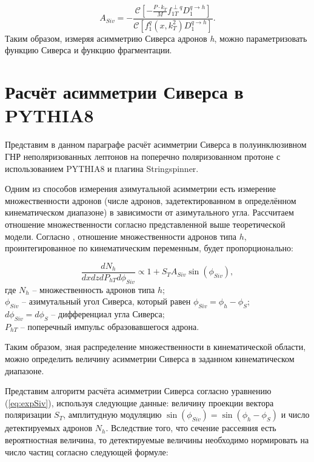 \documentclass{extreport}
\begin{document}
\begin{equation}
	A_{Siv} = - \frac{\mathcal{C}\left [-\frac{P\cdot k_T}{M}f_{1T}^{\perp q}D_1^{q \rightarrow h} \right]}{\mathcal{C} \left[f_1^q (x,k^2_T ) D_1^{q \rightarrow h} \right]}.
\end{equation}
Таким образом, измеряя асимметрию Сиверса адронов \textit{h}, можно параметризовать функцию Сиверса и функцию фрагментации. 




\section{Расчёт асимметрии Сиверса в PYTHIA8}

Представим в данном параграфе расчёт асимметрии Сиверса в полуинклюзивном ГНР неполяризованных лептонов на поперечно поляризованном протоне с использованием PYTHIA8 и плагина Stringspinner.  

Одним из способов измерения азимутальной асимметрии есть измерение множественности адронов (числе адронов, задетектированном в определённом кинематическом диапазоне) в зависимости от азимутального угла. Рассчитаем отношение множественности согласно представленной выше теоретической модели. Согласно \cite{Anselmino_2011}, отношение множественности адронов типа $h$, проинтегированное по кинематическим переменным, будет пропорционально:

\begin{equation}
	\label{eq:expSiv}
	\frac{dN_h}{dxdzdP_{hT}d\phi_{Siv}} \propto 1 + S_T A_{Siv} \sin (\phi_{Siv}),
\end{equation}
где $N_h$ -- множественность адронов типа $h$; \\
$\phi_{Siv}$ -- азимутальный угол Сиверса, который равен $\phi_{Siv} = \phi_{h} - \phi_S$; \\
$d\phi_{Siv} = d\phi_S$ -- дифференциал угла Сиверса; \\
$P_{hT}$ -- поперечный импульс образовавшегося адрона.

Таким образом, зная распределение множественности в кинематической области, можно определить величину асимметрии Сиверса в заданном кинематическом диапазоне. 

Представим алгоритм расчёта асимметрии Сиверса согласно уравнению (\ref{eq:expSiv}), используя следующие данные: величину проекции вектора поляризации $S_T$, амплитудную модуляцию $\sin (\phi_{Siv}) = \sin (\phi_{h} - \phi_S)$ и число детектируемых адронов $N_h$. Вследствие того, что сечение рассеяния есть вероятностная величина, то детектируемые величины необходимо нормировать на число частиц согласно следующей формуле:
\end{document}
